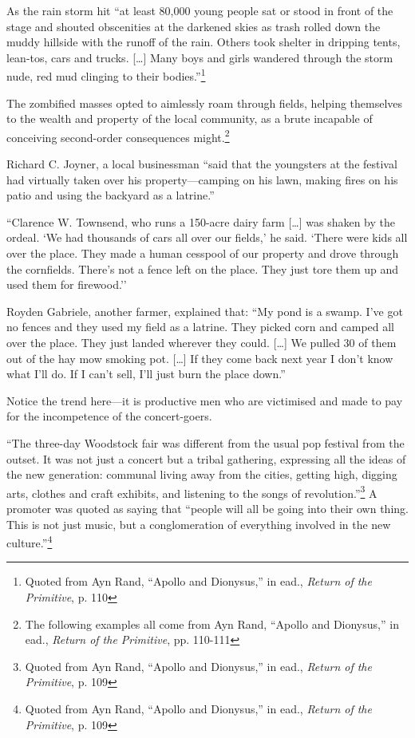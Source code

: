 \documentclass[11pt]{article}
\begin{document}
As the rain storm hit ``at least 80,000 young people sat or stood in front of the stage and shouted obscenities at the darkened skies as trash rolled down the muddy hillside with the runoff of the rain. Others took shelter in dripping tents, lean-tos, cars and trucks. [\ldots{}] Many boys and girls wandered through the storm nude, red mud clinging to their bodies.''\footnote{Quoted from Ayn Rand, ``Apollo and Dionysus,'' in ead., \emph{Return of the Primitive}, p. 110}

The zombified masses opted to aimlessly roam through fields, helping themselves to the wealth and property of the local community, as a brute incapable of conceiving second-order consequences might.\footnote{The following examples all come from Ayn Rand, ``Apollo and Dionysus,'' in ead., \emph{Return of the Primitive}, pp. 110-111}

Richard C. Joyner, a local businessman ``said that the youngsters at the festival had virtually taken over his property---camping on his lawn, making fires on his patio and using the backyard as a latrine.''

``Clarence W. Townsend, who runs a 150-acre dairy farm [\ldots{}] was shaken by the ordeal. `We had thousands of cars all over our fields,' he said. `There were kids all over the place. They made a human cesspool of our property and drove through the cornfields. There's not a fence left on the place. They just tore them up and used them for firewood.''

Royden Gabriele, another farmer, explained that: ``My pond is a swamp. I've got no fences and they used my field as a latrine. They picked corn and camped all over the place. They just landed wherever they could. [\ldots{}] We pulled 30 of them out of the hay mow smoking pot. [\ldots{}] If they come back next year I don't know what I'll do. If I can't sell, I'll just burn the place down.''

Notice the trend here---it is productive men who are victimised and made to pay for the incompetence of the concert-goers.

``The three-day Woodstock fair was different from the usual pop festival from the outset. It was not just a concert but a tribal gathering, expressing all the ideas of the new generation: communal living away from the cities, getting high, digging arts, clothes and craft exhibits, and listening to the songs of revolution.''\footnote{Quoted from Ayn Rand, ``Apollo and Dionysus,'' in ead., \emph{Return of the Primitive}, p. 109} A promoter was quoted as saying that ``people will all be going into their own thing. This is not just music, but a conglomeration of everything involved in the new culture.''\footnote{Quoted from Ayn Rand, ``Apollo and Dionysus,'' in ead., \emph{Return of the Primitive}, p. 109}
\end{document}
